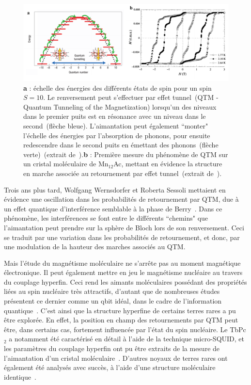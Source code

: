 \begin{figure}
\centering \includegraphics[scale=0.45]{Spintronique/MolecularMag/MolecularMag.pdf}
\caption{ \textbf{a} : échelle des énergies des différents états de spin pour un spin $S=10$. Le renversement peut s'effectuer par effet tunnel~(QTM - Quantum Tunneling of the Magnetization) lorsqu'un des niveaux dans le premier puits est en résonance avec un niveau dans le second~(flèche bleue). L'aimantation peut également ``monter" l'échelle des énergies par l’absorption de phonons, pour ensuite redescendre dans le second puits en émettant des phonons~(flèche verte)~(extrait de~\cite{Bogani2008}).\textbf{b} : Première mesure du phénomène de QTM sur un cristal moléculaire de Mn$_{12}$Ac, mettant en évidence la structure en marche associée au retournement par effet tunnel~(extrait de~\cite{Thomas1996}).}
\label{MolecularMag}
\end{figure}

Trois ans plus tard, Wolfgang Wernsdorfer et Roberta Sessoli mettaient en évidence une oscillation dans les probabilités de retournement par QTM, due à un effet quantique d'interférence semblable à la phase de Berry~\cite{Wernsdorfer1999}. Dans ce phénomène, les interférences se font entre le différents ``chemins" que l’aimantation peut prendre sur la sphère de Bloch lors de son renversement. Ceci se traduit par une variation dans les probabilités de retournement, et donc, par une modulation de la hauteur des marches associés au QTM.

Mais l'étude du magnétisme moléculaire ne s'arr\^ete pas au moment magnétique électronique. Il peut également mettre en jeu le magnétisme nucléaire au travers du couplage hyperfin. Ceci rend les aimants moléculaires possédant des propriétés liées au spin nucléaire très attractifs, d'autant que de nombreuses études présentent ce dernier comme un qbit idéal, dans le cadre de l'information quantique~\cite{Kane1998,Vandersypen2001,Leuenberger2003}. C'est ainsi que la structure hyperfine de certains terres rares a pu être explorée. En effet, la position en champ des retournements par QTM peut être, dans certains cas, fortement influencée par l'état du spin nucléaire. Le TbPc$_{2}$ a notamment été caractérisé en détail à l'aide de la technique micro-SQUID, et les paramètres du couplage hyperfin ont pu être extraits de la mesure de l'aimantation d'un cristal moléculaire~\cite{Ishikawa2005}. D'autres noyaux de terres rares ont également été analysés avec succès, à l'aide d'une structure moléculaire identique~\cite{Ishikawa2005a}.


